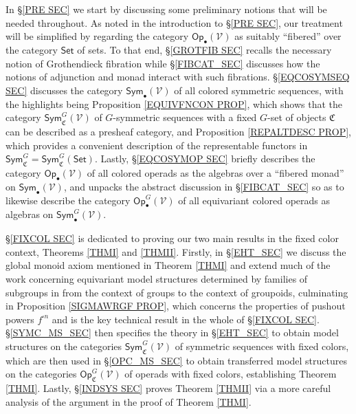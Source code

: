\documentclass[a4paper,10pt
,draft
]{article}%
\numberwithin{equation}{section}
\numberwithin{figure}{section}
\theoremstyle{definition} %
\newcommand{\V}{\ensuremath{\mathcal V}}
\newcommand{\1}{\ensuremath{\mathbbm 1}}%
\begin{document}
In \S \ref{PRE SEC} we start by discussing some preliminary notions that will be needed throughout.
As noted in the introduction to 
\S \ref{PRE SEC}, our treatment will be simplified by regarding the category
$\mathsf{Op}_{\bullet}(\V)$
as suitably ``fibered'' over the category $\mathsf{Set}$
of sets.
To that end, 
\S \ref{GROTFIB SEC}
recalls the necessary notion of Grothendieck fibration 
while \S \ref{FIBCAT_SEC}
discusses how the notions of adjunction and monad %
interact with such fibrations.
%
\S \ref{EQCOSYMSEQ SEC}
discusses the category
$\mathsf{Sym}_{\bullet}(\V)$
of all colored symmetric sequences,
with the highlights being 
Proposition \ref{EQUIVFNCON PROP},
which shows that the category
$\mathsf{Sym}^G_{\mathfrak{C}}(\V)$
of $G$-symmetric sequences with a fixed $G$-set of objects
$\mathfrak{C}$ can be described as a presheaf category,
and 
Proposition \ref{REPALTDESC PROP},
which provides a convenient description of the representable functors in 
$\mathsf{Sym}^G_{\mathfrak{C}} = \mathsf{Sym}^G_{\mathfrak{C}}(\mathsf{Set})$.
%
Lastly, \S \ref{EQCOSYMOP SEC}
briefly describes the category 
$\mathsf{Op}_{\bullet}(\V)$ 
of all colored operads as the algebras over a ``fibered monad''
on  
$\mathsf{Sym}_{\bullet}(\V)$,
and unpacks the abstract discussion in \S \ref{FIBCAT_SEC}
so as to likewise describe the category 
$\mathsf{Op}_{\bullet}^G(\V)$ 
of all equivariant colored operads
as algebras on 
$\mathsf{Sym}^G_{\bullet}(\V)$.


\S \ref{FIXCOL SEC}
is dedicated to proving our two main results in the fixed color context, Theorems \ref{THMI} and \ref{THMII}.
Firstly, in \S \ref{EHT_SEC} we discuss the global monoid axiom mentioned in Theorem \ref{THMI}
and extend much of the work 
concerning equivariant model structures determined by families of subgroups in \cite[\S 6]{BP_geo}
from the context of groups to the context of groupoids,
culminating in 
Proposition \ref{SIGMAWRGF PROP},
which concerns the properties of pushout powers $f^{\square n}$
and is the key technical result in the whole of \S \ref{FIXCOL SEC}.
%
\S \ref{SYMC_MS_SEC} then specifies the theory in
\S \ref{EHT_SEC}
to obtain model structures on the categories
$\mathsf{Sym}^G_{\mathfrak{C}}(\V)$ of symmetric sequences with fixed colors,
which are then used in \S \ref{OPC_MS_SEC}
to obtain transferred model structures on the 
categories
$\mathsf{Op}^G_{\mathfrak{C}}(\V)$
of operads with fixed colors, establishing Theorem \ref{THMI}.
Lastly, \S \ref{INDSYS SEC} proves Theorem \ref{THMII}
via a more careful analysis of the argument in the proof of 
Theorem \ref{THMI}.
\end{document}

